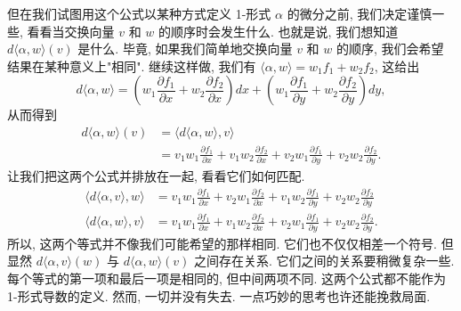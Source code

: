 但在我们试图用这个公式以某种方式定义 1-形式 $\alpha$ 的微分之前, 我们决定谨慎一些, 看看当交换向量 $v$ 和 $w$ 的顺序时会发生什么. 也就是说, 我们想知道 $d\langle\alpha,w\rangle(v)$ 是什么. 毕竟, 如果我们简单地交换向量 $v$ 和 $w$ 的顺序, 我们会希望结果在某种意义上"相同". 继续这样做, 我们有 $\langle\alpha,w\rangle=w_1f_1+w_2f_2$, 这给出
\[
d\langle\alpha,w\rangle=\left(w_1\frac{\partial f_1}{\partial x}+w_2\frac{\partial f_2}{\partial x}\right)dx
+\left(w_1\frac{\partial f_1}{\partial y}+w_2\frac{\partial f_2}{\partial y}\right)dy,
\]
从而得到
\begin{align*}
d\langle\alpha,w\rangle(v)&=\bigl\langle d\langle\alpha,w\rangle,v\bigr\rangle\\
&=v_1w_1\frac{\partial f_1}{\partial x}+v_1w_2\frac{\partial f_2}{\partial x}
+v_2w_1\frac{\partial f_1}{\partial y}+v_2w_2\frac{\partial f_2}{\partial y}.
\end{align*}
让我们把这两个公式并排放在一起, 看看它们如何匹配.
\begin{align*}
\bigl\langle d\langle\alpha,v\rangle,w\bigr\rangle
&=v_1w_1\frac{\partial f_1}{\partial x}+v_2w_1\frac{\partial f_2}{\partial x}
+v_1w_2\frac{\partial f_1}{\partial y}+v_2w_2\frac{\partial f_2}{\partial y}\\
\bigl\langle d\langle\alpha,w\rangle,v\bigr\rangle
&=v_1w_1\frac{\partial f_1}{\partial x}+v_1w_2\frac{\partial f_2}{\partial x}
+v_2w_1\frac{\partial f_1}{\partial y}+v_2w_2\frac{\partial f_2}{\partial y}.
\end{align*}
所以, 这两个等式并不像我们可能希望的那样相同. 它们也不仅仅相差一个符号. 但显然 $d\langle\alpha,v\rangle(w)$ 与 $d\langle\alpha,w\rangle(v)$ 之间存在关系. 它们之间的关系要稍微复杂一些. 每个等式的第一项和最后一项是相同的, 但中间两项不同. 这两个公式都不能作为 1-形式导数的定义. 然而, 一切并没有失去. 一点巧妙的思考也许还能挽救局面.

